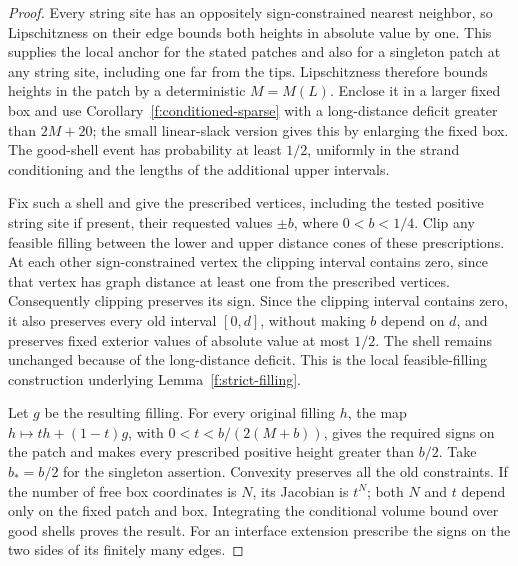 \begin{proof}
Every string site has an oppositely sign-constrained nearest neighbor,
so Lipschitzness on their edge bounds both heights in absolute value by one.
This supplies the local anchor for the stated patches and also for a
singleton patch at any string site, including one far from the tips.
Lipschitzness therefore bounds heights in the patch by a deterministic
\(M=M(L)\). Enclose it in
a larger fixed box and use Corollary~\ref{f:conditioned-sparse} with a long-distance
deficit greater than \(2M+20\); the small linear-slack version gives this
by enlarging the fixed box. The good-shell event has probability at least
\(1/2\), uniformly in the strand conditioning and the lengths of the
additional upper intervals.

Fix such a shell and give the prescribed vertices, including the tested
positive string site if present, their requested values
\(\pm b\), where \(0<b<1/4\). Clip any feasible filling between the lower
and upper distance cones of these prescriptions. At each other
sign-constrained vertex the clipping interval contains zero, since that
vertex has graph distance at least one from the prescribed vertices.
Consequently clipping preserves its sign. Since the clipping interval
contains zero, it also preserves every old interval \([0,d]\), without
making \(b\) depend on \(d\), and preserves
fixed exterior values of absolute value at most \(1/2\). The shell remains
unchanged because of the long-distance deficit. This is the local
feasible-filling construction underlying Lemma~\ref{f:strict-filling}.

Let \(g\) be the resulting filling. For every original filling \(h\), the
map \(h\mapsto t h+(1-t)g\), with
\(0<t<b/(2(M+b))\), gives the required signs on the patch and makes
every prescribed positive height greater than \(b/2\). Take \(b_*=b/2\)
for the singleton assertion. Convexity preserves all the old constraints. If the number of free box
coordinates is \(N\), its Jacobian is \(t^N\); both \(N\) and \(t\) depend
only on the fixed patch and box. Integrating the conditional volume bound
over good shells proves the result. For an interface extension prescribe
the signs on the two sides of its finitely many edges.
\end{proof}

